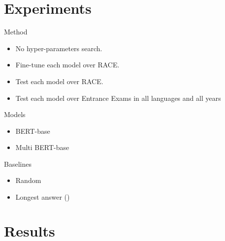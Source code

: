 \documentclass[]{beamer}
\def\mAlertSpace{\vspace{0.5em}}
\begin{document}
\section{Experiments}
  \begin{frame}{\secname}
    \begin{alertblock}{Method}
      \begin{itemize}
        \item No hyper-parameters search.
        \item Fine-tune each model over RACE.
        \item Test each model over RACE.
        \item Test each model over Entrance Exams in all languages and all years
      \end{itemize}
    \end{alertblock}
  \end{frame}

  \begin{frame}{\secname}
    \begin{alertblock}{Models}
      \mAlertSpace
      \begin{itemize}
        \item BERT-base
        \item Multi BERT-base
      \end{itemize}
    \end{alertblock}
    \begin{alertblock}{Baselines}
      \mAlertSpace
      \begin{itemize}
        \item Random
        \item Longest answer (\cite{Rogers2020quail})
      \end{itemize}
    \end{alertblock}
  \end{frame}

\section{Results}
  \begin{frame}{\secname}
    \hspace{-1cm}
    
    \mAlertSpace
  \end{frame}

\end{document}
